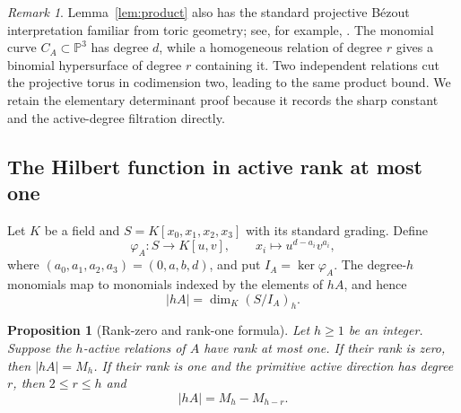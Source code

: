 \documentclass[11pt,reqno]{amsart}
\newtheorem{proposition}[theorem]{Proposition}
\theoremstyle{definition}
\theoremstyle{remark}
\newtheorem{remark}[theorem]{Remark}
\begin{document}
\begin{remark}
Lemma~\ref{lem:product} also has the standard projective B\'{e}zout
interpretation familiar from toric geometry; see, for example,
\cite{Sturmfels1996}.
The monomial curve $C_A\subset\mathbb P^3$ has degree $d$, while a
homogeneous relation of degree $r$ gives a binomial hypersurface of degree
$r$ containing it.  Two independent relations cut the projective torus in
codimension two, leading to the same product bound.  We retain the
elementary determinant proof because it records the sharp constant and the
active-degree filtration directly.
\end{remark}

\subsection{The Hilbert function in active rank at most one}

Let $K$ be a field and $S=K[x_0,x_1,x_2,x_3]$ with its standard grading.
Define
\begin{equation}\label{eq:toricmap}
 \varphi_A:S\longrightarrow K[u,v],\qquad
 x_i\longmapsto u^{d-a_i}v^{a_i},
\end{equation}
where $(a_0,a_1,a_2,a_3)=(0,a,b,d)$, and put
$I_A=\ker\varphi_A$.  The degree-$h$ monomials map to monomials indexed
by the elements of $hA$, and hence
\begin{equation}\label{eq:Hilbert}
 |hA|=\dim_K(S/I_A)_h.
\end{equation}

\begin{proposition}[Rank-zero and rank-one formula]\label{prop:rankone}
Let $h\geq1$ be an integer.  Suppose the $h$-active relations of $A$ have
rank at most one.
If their rank is zero, then $|hA|=M_h$.  If their rank is one and the
primitive active direction has degree $r$, then $2\leq r\leq h$ and
\begin{equation}\label{eq:rankone}
 |hA|=M_h-M_{h-r}.
\end{equation}
\end{proposition}
\end{document}
